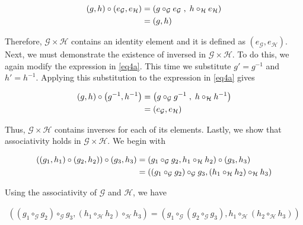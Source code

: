 \documentclass{article}[12]
\numberwithin{equation}{section}
\begin{document}
\begin{flushleft}
\begin{align}
  \left( g, h \right) \circ \left( e_\mathcal{G}, e_\mathcal{H} \right) &= \left( g \circ_\mathcal{G} e_\mathcal{G} \; , \; h \circ_\mathcal{H} e_\mathcal{H} \right) \notag \\
  &= \left( g, h \right) \notag
\end{align}

Therefore, $\mathcal{G} \times \mathcal{H}$ contains an identity element and it is defined as $\left( e_\mathcal{G}, e_\mathcal{H} \right)$.  Next, we must demonstrate the existence of inversed in $\mathcal{G} \times \mathcal{H}$.  To do this, we again modify the expression in \ref{eq4a}.  This time we substitute $g' = g^{-1}$ and $h' = h^{-1}$.  Applying this substitution to the expression in \ref{eq4a} gives

\begin{align}
  \left( g, h \right) \circ \left( g^{-1}, h^{-1} \right) &= \left( g \circ_\mathcal{G} g^{-1} \; , \; h \circ_\mathcal{H} h^{-1} \right) \notag \\
  &= \left( e_\mathcal{G}, e_\mathcal{H} \right) \notag
\end{align}

Thus, $\mathcal{G} \times \mathcal{H}$ contains inverses for each of its elements.  Lastly, we show that associativity holds in $\mathcal{G} \times \mathcal{H}$.  We begin with

\begin{align}
  \left( \left( g_1 , h_1 \right) \circ \left( g_2, h_2 \right) \right) \circ \left( g_3, h_3 \right) &= \left( g_1 \circ_\mathcal{G} g_2, h_1 \circ_\mathcal{H} h_2 \right) \circ \left( g_3, h_3 \right) \notag \\
  &= \left( \left(g_1 \circ_\mathcal{G} g_2\right) \circ_\mathcal{G} g_3, \left(h_1 \circ_\mathcal{H} h_2\right) \circ_\mathcal{H} h_3 \right) \label{eq4b}
\end{align}

Using the associativity of $\mathcal{G}$ and $\mathcal{H}$, we have

\begin{align*}
  \left( \left(g_1 \circ_\mathcal{G} g_2\right) \circ_\mathcal{G} g_3, \left(h_1 \circ_\mathcal{H} h_2\right) \circ_\mathcal{H} h_3 \right) = \left( g_1 \circ_\mathcal{G} \left(g_2 \circ_\mathcal{G} g_3\right), h_1 \circ_\mathcal{H} \left(h_2 \circ_\mathcal{H} h_3\right) \right)
\end{align*}































\end{flushleft}
\end{document}
